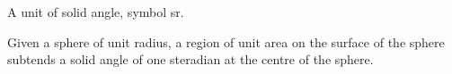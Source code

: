 A unit of solid angle, symbol sr.
\par
Given a sphere of unit radius, a region of unit area on the surface of the sphere
subtends a solid angle of one steradian at the centre of the sphere.